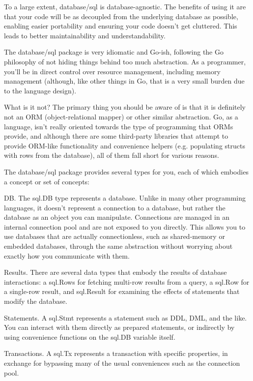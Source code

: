 \documentclass{vivid_layout}
\begin{document}
To a large extent, database/sql is database-agnostic. The benefits of using it are that your code will be as decoupled from the underlying database as possible, enabling easier portability and ensuring your code doesn’t get cluttered. This leads to better maintainability and understandability.

The database/sql package is very idiomatic and Go-ish, following the Go philosophy of not hiding things behind too much abstraction. As a programmer, you’ll be in direct control over resource management, including memory management (although, like other things in Go, that is a very small burden due to the language design).

What is it not? The primary thing you should be aware of is that it is definitely not an ORM (object-relational mapper) or other similar abstraction. Go, as a language, isn’t really oriented towards the type of programming that ORMs provide, and although there are some third-party libraries that attempt to provide ORM-like functionality and convenience helpers (e.g. populating structs with rows from the database), all of them fall short for various reasons.

The database/sql package provides several types for you, each of which embodies a concept or set of concepts:

DB. The sql.DB type represents a database. Unlike in many other programming languages, it doesn’t represent a connection to a database, but rather the database as an object you can manipulate. Connections are managed in an internal connection pool and are not exposed to you directly. This allows you to use databases that are actually connectionless, such as shared-memory or embedded databases, through the same abstraction without worrying about exactly how you communicate with them.

Results. There are several data types that embody the results of database interactions: a sql.Rows for fetching multi-row results from a query, a sql.Row for a single-row result, and sql.Result for examining the effects of statements that modify the database.

Statements. A sql.Stmt represents a statement such as DDL, DML, and the like. You can interact with them directly as prepared statements, or indirectly by using convenience functions on the sql.DB variable itself.

Transactions. A sql.Tx represents a transaction with specific properties, in exchange for bypassing many of the usual conveniences such as the connection pool.
\end{document}
